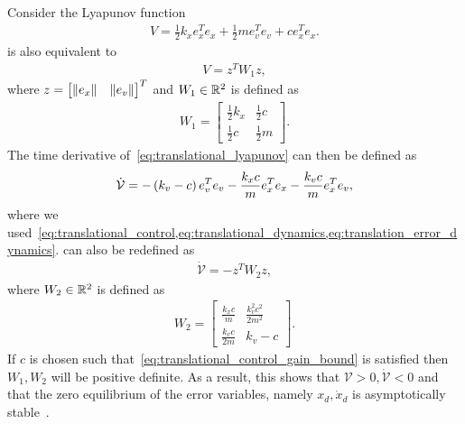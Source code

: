 Consider the Lyapunov function
\begin{align}\label{eq:translational_lyapunov}
    V = \frac{1}{2} k_x e_x^T e_x + \frac{1}{2} m e_v^T e_v + c e_x^T e_x.
\end{align}
 is also equivalent to
\begin{align}\label{eq:translational_lyapunov_matrix}
    V = z^T W_1 z , 
\end{align}
where \( z = \begin{bmatrix} \left\| e_x \right\| & \left\| e_v \right\| \end{bmatrix}^T \) and \( W_1\in \mathbb{R}^2\) is defined as
\begin{align}\label{eq:translational_lyapunov_W}
    W_1 = \begin{bmatrix}
        \frac{1}{2} k_x & \frac{1}{2} c \\
        \frac{1}{2} c & \frac{1}{2} m 
    \end{bmatrix}.
\end{align}
The time derivative of~\cref{eq:translational_lyapunov} can then be defined as
\begin{align}\label{eq:translation_lyapunov_derivative}
    \dot{\mathcal{V} } = - \left( k_v - c \right) e_v^T e_v - \frac{k_x c}{m} e_x^T e_x - \frac{k_v c}{m} e_x^T e_v, 
\end{align}
where we used~\cref{eq:translational_control,eq:translational_dynamics,eq:translation_error_dynamics}.
 can also be redefined as
\begin{align}\label{eq:translational_lyapunov_derivative_matrix}
    \dot{\mathcal{V}} = - z^T W_2 z, 
\end{align}
where \( W_2 \in \mathbb{R}^2 \) is defined as
\begin{align}\label{eq:translational_lyapunov_W2}
    W_2 = \begin{bmatrix}
        \frac{k_x c}{m} & \frac{k_v^2 c^2}{2 m^2} \\
        \frac{k_v c}{2 m} & k_v - c
    \end{bmatrix}.
\end{align}
If \( c \) is chosen such that~\cref{eq:translational_control_gain_bound} is satisfied then \( W_1, W_2 \) will be positive definite.
As a result, this shows that \( \mathcal{V} > 0 , \dot{ \mathcal{V}} < 0 \) and that the zero equilibrium of the error variables, namely \( x_d, \dot{x}_d \) is asymptotically stable~\cite{khalil1996}.



